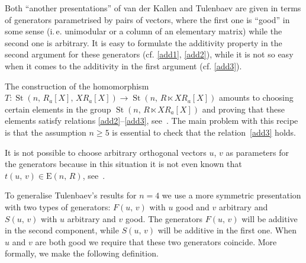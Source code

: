 \documentclass[11pt]{amsart}
\theoremstyle{plain} \declaretheorem[name=Theorem, Refname={Theorem,Theorems}]{tm} \Crefname{tm}{Theorem}{Theorems}
\numberwithin{equation}{section}
\theoremstyle{definition} \newtheorem{df}[lm]{Definition} \Crefname{df}{Definition}{Definitions}
\theoremstyle{remark} \newtheorem{rk}[lm]{Remark} \Crefname{rk}{Remark}{Remarks}
\newcommand{\E}{{\mathrm{E}}}
\newcommand{\St}{\mathop{\mathrm{St}}\nolimits}
\begin{document}
Both ``another presentations'' of van der Kallen and Tulenbaev are given in terms of generators parametrised by pairs of vectors,
 where the first one is ``good'' in some sense  (i.\,e. unimodular or a column of an elementary matrix) while the second one is arbitrary.
It is easy to formulate the additivity property in the second argument for these generators (cf. \eqref{add1}, \eqref{add2}),
while it is not so easy when it comes to the additivity in the first argument (cf. \eqref{add3}).

The construction of the homomorphism $T\colon\St(n,\,R_a[X],\,XR_a[X])\rightarrow\St(n,\,R\ltimes XR_a[X])$
amounts to choosing certain elements in the group $\St(n,\,R\ltimes XR_a[X])$ and proving that these elements satisfy relations \eqref{add2}--\eqref{add3}, see~\cite[Lemmas~1.2 and~1.3\,c)]{Tul}.
The main problem with this recipe is that the assumption $n\geq5$ is essential to check that the relation~\eqref{add3} holds.

It is not possible to choose arbitrary orthogonal vectors $u$, $v$ as parameters for the generators because in this situation it is not even known that $t(u,\,v)\in\E(n,\,R)$, see~\cite{Rao}. 

To generalise Tulenbaev's results for $n=4$ we use a more symmetric presentation with two types of generators: 
$F(u,\,v)$ with $u$ good and $v$ arbitrary and $S(u,\,v)$ with $u$ arbitrary and $v$ good.
The generators $F(u,\,v)$ will be additive in the second component, while $S(u,\,v)$ will be additive in the first one.
When $u$ and $v$ are both good we require that these two generators coincide.
More formally, we make the following definition.
\end{document}

